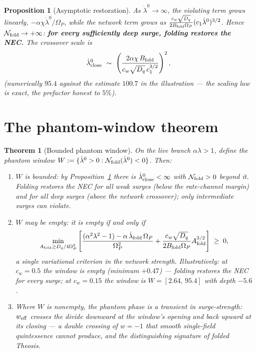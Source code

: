 \documentclass[11pt,a4paper,oneside]{book}
\newcommand{\Op}{\Omega_P}
\newcommand{\Af}{A_{\rm fold}}
\newcommand{\Bf}{B_{\rm fold}}
\newcommand{\Dq}{D_q}
\newcommand{\ldz}{\dot\lambda^{0}}
\newcommand{\ldf}{\dot\lambda_{\rm fold}}
\newcommand{\NEC}{\mathcal N}
\theoremstyle{plain}
\newtheorem{proposition}{Proposition}[chapter]
\newtheorem{theorem}{Theorem}[chapter]
\theoremstyle{definition}
\theoremstyle{remark}
\begin{document}
\begin{proposition}[Asymptotic restoration]\label{necrestoration:prop:asym}
As $\ldz\to\infty$, the violating term grows linearly,
$-\alpha\chi\ldz/\Op$, while the network term grows as
$\tfrac{c_w\sqrt{\Dq}}{2\Bf\Op}(c_1\ldz)^{3/2}$. Hence
$\NEC_{\rm fold}\to+\infty$: \textbf{for every sufficiently deep surge, folding restores the NEC.} The
crossover scale is
\begin{equation}
\ldz_{\rm close}\ \sim\ \left(\frac{2\alpha\chi\,\Bf}{c_w\sqrt{\Dq}\,c_1^{3/2}}\right)^{2},
\end{equation}
(numerically $95.4$ against the estimate $100.7$ in the illustration --- the scaling law is exact, the
prefactor honest to $5\%$).
\end{proposition}

\section{The phantom-window theorem}

\begin{theorem}[Bounded phantom window]\label{necrestoration:thm:window}
On the live branch $\alpha\lambda>1$, define the phantom window
$W:=\{\ldz>0:\NEC_{\rm fold}(\ldz)<0\}$. Then:
\begin{enumerate}[label=(\roman*),leftmargin=1.8em,itemsep=2pt]
\item $W$ is \emph{bounded}: by Proposition~\ref{necrestoration:prop:asym} there is $\ldz_{\rm close}<\infty$ with
$\NEC_{\rm fold}>0$ beyond it. Folding restores the NEC for all weak surges (below the rate-channel
margin) and for all deep surges (above the network crossover); only intermediate surges can violate.
\item $W$ may be \emph{empty}: it is empty if and only if
\begin{equation}
\min_{\Af\ge\Dq/4\Op^{2}}
\left[\frac{(\alpha^2\lambda^2-1)-\alpha\,\ldf\,\Op}{\Op^{2}}
+\frac{c_w\sqrt{\Dq}}{2\Bf\Op}\Af^{3/2}\right]\;\ge\;0,
\end{equation}
a single variational criterion in the network strength. Illustratively: at $c_w=0.5$ the window is
empty (minimum $+0.47$) --- folding restores the NEC for \emph{every} surge; at $c_w=0.15$ the window is
$W=[2.64,\,95.4]$ with depth $-5.6$.
\item Where $W$ is nonempty, the phantom phase is a \emph{transient in surge-strength}: $w_{\rm eff}$
crosses the divide downward at the window's opening and back upward at its closing --- a double crossing
of $w=-1$ that smooth single-field quintessence cannot produce, and the distinguishing signature of
folded Theosis.
\end{enumerate}
\end{theorem}
\end{document}
